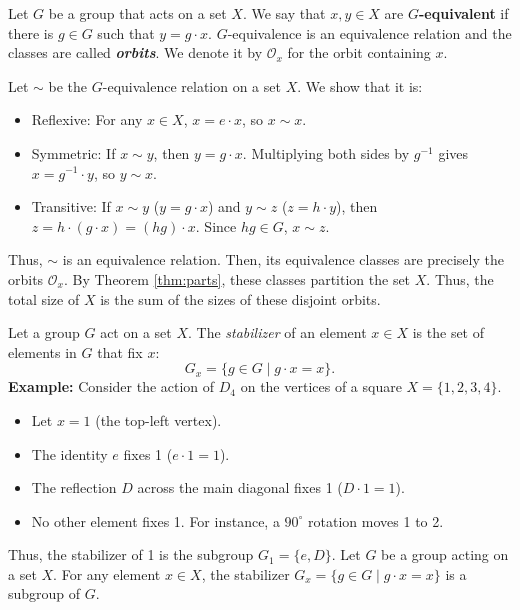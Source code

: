 \documentclass[a4paper,12pt]{article}
\begin{document}
{
    Let $G$ be a group that acts on a set $X.$ We say that $x,y \in X$ are \textbf{$G$-equivalent} if there is $g \in G$ such that $y=g\cdot x.$ $G$-equivalence is an equivalence relation and the classes are called \textbf{\textit{orbits}}. We denote it by $\mathcal{O}_x$ for the orbit containing $x$.
}
{
    Let $\sim$ be the $G$-equivalence relation on a set $X$. We show that it is:
    \begin{itemize}
        \item {Reflexive:} For any $x \in X$, $x = e \cdot x$, so $x \sim x$.
        \item {Symmetric:} If $x \sim y$, then $y = g \cdot x$. Multiplying both sides by $g^{-1}$ gives $x = g^{-1} \cdot y$, so $y \sim x$.
        \item {Transitive:} If $x \sim y$ ($y = g \cdot x$) and $y \sim z$ ($z = h \cdot y$), then $z = h \cdot (g \cdot x) = (hg) \cdot x$. Since $hg \in G$, $x \sim z$.
    \end{itemize}
    
    Thus, $\sim$ is an equivalence relation. Then, its equivalence classes are precisely the orbits $\mathcal{O}_x$. By Theorem \ref{thm:parts}, these classes partition the set $X$. Thus, the total size of $X$ is the sum of the sizes of these disjoint orbits.
}
{
    Let a group $G$ act on a set $X$. The \textit{stabilizer} of an element $x \in X$ is the set of elements in $G$ that fix $x$:
    \[ G_x = \{ g \in G \mid g \cdot x = x \}. \]
}
\textbf{Example:} Consider the action of $D_4$ on the vertices of a square $X=\{1, 2, 3, 4\}$.
\begin{itemize}
    \item Let $x = 1$ (the top-left vertex).
    \item The identity $e$ fixes 1 ($e \cdot 1 = 1$).
    \item The reflection $D$ across the main diagonal fixes 1 ($D \cdot 1 = 1$).
    \item No other element fixes 1. For instance, a $90^\circ$ rotation moves 1 to 2.
\end{itemize}
Thus, the stabilizer of 1 is the subgroup $G_1 = \{e, D\}$.
{
    Let $G$ be a group acting on a set $X$. For any element $x \in X$, the stabilizer $G_x = \{g \in G \mid g \cdot x = x\}$ is a subgroup of $G$.
}
\end{document}

